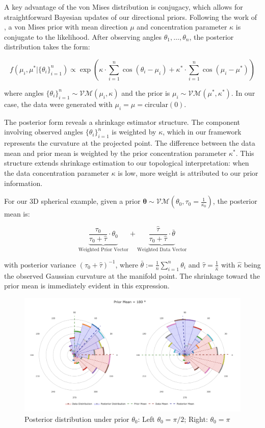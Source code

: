 \documentclass[twoside,11pt]{article}
\begin{document}
A key advantage of the von Mises distribution is conjugacy, which allows for straightforward Bayesian updates of our directional priors. Following the work of \citet{mardia1976}, a von Mises prior with mean direction $\mu$ and concentration parameter $\kappa$ is conjugate to the likelihood. After observing angles $\theta_1,\ldots,\theta_n$, the posterior distribution takes the form:

$$
f(\mu_i, \mu^* | \{\theta_i\}_{i=1}^n) \propto \exp(\kappa \cdot \sum_{i=1}^n \cos(\theta_i - \mu_i) +\kappa^* \cdot \sum_{i=1}^n \cos(\mu_i - \mu^*))
$$

where angles $\{\theta_i\}_{i=1}^n \sim \mathcal{VM}(\mu_i, \kappa)$ and the prior is $\mu_i \sim \mathcal{VM}(\mu^*, \kappa^*)$. In our case, the data were generated with $\mu_i = \mu = \text{circular}(0)$.

The posterior form reveals a shrinkage estimator structure. The component involving observed angles $\{\theta_i\}_{i=1}^n$ is weighted by $\kappa$, which in our framework represents the curvature at the projected point. The difference between the data mean and prior mean is weighted by the prior concentration parameter $\kappa^*$. This structure extends shrinkage estimation to our topological interpretation: when the data concentration parameter $\kappa$ is low, more weight is attributed to our prior information.

For our 3D spherical example, given a prior $\boldsymbol{\theta} \sim \mathcal{VM}(\theta_0, \tau_0 = \frac{1}{\kappa_0})$, the posterior mean is:

$$
\underbrace{\frac{\tau_0}{\tau_0 + \hat{\tau}} \cdot \theta_0}_{\text{Weighted Prior Vector}} + \underbrace{\frac{\hat{\tau}}{\tau_0 + \hat{\tau}} \cdot \bar{\theta}}_{\text{Weighted Data Vector}}
$$

with posterior variance $(\tau_0 + \hat{\tau})^{-1}$, where $\bar{\theta} := \frac{1}{n}\sum_{i=1}^n \theta_i$ and $\hat{\tau} = \frac{1}{\hat{\kappa}}$ with $\hat{\kappa}$ being the observed Gaussian curvature at the manifold point. The shrinkage toward the prior mean is immediately evident in this expression.

\begin{figure}[h!]
  \begin{center}
    \includegraphics[width=1\textwidth]{../fig/posterior-roseplot.png}
  \end{center}
  \caption{Posterior distribution under prior $\theta_0$: Left $\theta_0 = \pi/2$; Right: $\theta_0 = \pi$}\label{fig:posteriors}
\end{figure}
\end{document}
